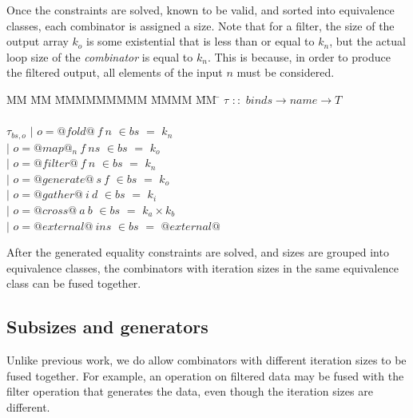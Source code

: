 Once the constraints are solved, known to be valid, and sorted into equivalence classes, each combinator is assigned a size.
Note that for a filter, the size of the output array $k_o$ is some existential that is less than or equal to $k_n$, but the actual loop size of the \emph{combinator} is equal to $k_n$.
This is because, in order to produce the filtered output, all elements of the input $n$ must be considered.


\begin{tabbing}
MM \= MM \= MMMMMMMMM \= MMMM \= MM \= \kill
$\tau$  \>$::$\> $binds \rightarrow name \rightarrow T$ \\
\\
$\tau_{bs,o}$    
            \> $|$ \> $o = @fold@~f~n$      \> $\in bs$ \> $=$ \> $k_n$ \\
            \> $|$ \> $o = @map@_n~f~ns$    \> $\in bs$ \> $=$ \> $k_o$ \\
            \> $|$ \> $o = @filter@~f~n$    \> $\in bs$ \> $=$ \> $k_n$ \\
            \> $|$ \> $o = @generate@~s~f$  \> $\in bs$ \> $=$ \> $k_o$ \\
            \> $|$ \> $o = @gather@~i~d$    \> $\in bs$ \> $=$ \> $k_i$ \\
            \> $|$ \> $o = @cross@~a~b$     \> $\in bs$ \> $=$ \> $k_a \times k_b$ \\
            \> $|$ \> $o = @external@~ins$  \> $\in bs$ \> $=$ \> $@external@$ \\
\end{tabbing}

After the generated equality constraints are solved, and sizes are grouped into equivalence classes, the combinators with iteration sizes in the same equivalence class can be fused together.

\subsection{Subsizes and generators}
Unlike previous work, we do allow combinators with different iteration sizes to be fused together.
For example, an operation on filtered data may be fused with the filter operation that generates the data, even though the iteration sizes are different.



